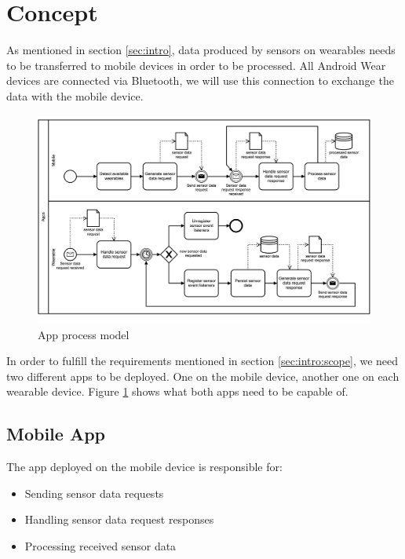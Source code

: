 \section{Concept}
\label{sec:concept}

As mentioned in section \ref{sec:intro}, data produced by sensors on wearables needs to be transferred to mobile devices in order to be processed.
All Android Wear devices are connected via Bluetooth, we will use this connection to exchange the data with the mobile device.

\begin{figure}[H]
	\includegraphics[width=\linewidth]{diagrams/apps.png}
	\caption[Caption for bpmn]{App process model}
	\label{fig:diagrams:apps}
\end{figure}

In order to fulfill the requirements mentioned in section \ref{sec:intro:scope}, we need two different apps to be deployed.
One on the mobile device, another one on each wearable device.
Figure \ref{fig:diagrams:apps} shows what both apps need to be capable of.

\clearpage

\subsection{Mobile App}
\label{sec:concept:mobileapp}
The app deployed on the mobile device is responsible for:
\begin{itemize}[noitemsep]
	\item Sending sensor data requests
	\item Handling sensor data request responses
	\item Processing received sensor data
\end{itemize}

